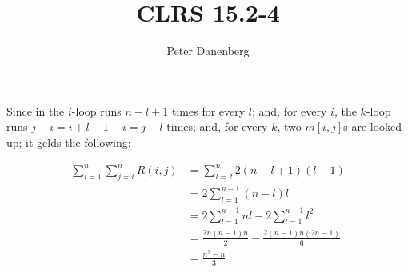 \documentclass{article}
\title{CLRS 15.2-4}
\author{Peter Danenberg}
\begin{document}
\maketitle

Since in  the $i$-loop runs $n - l + 1$ times
for every $l$; and, for every $i$, the $k$-loop runs $j - i = i + l -
1 - i = j - l$ times; and, for every $k$, two $m[i,j]$s are looked up;
it gelds the following:

\begin{align}
  \sum_{i=1}^n\sum_{j=i}^nR(i,j) &= \sum_{l=2}^n2(n-l+1)(l-1)\\
  &= 2\sum_{l=1}^{n-1}(n-l)l\\
  &= 2\sum_{l=1}^{n-1}nl-2\sum_{l=1}^{n-1}l^2\\
  &= \frac{2n(n-1)n}{2} - \frac{2(n-1)n(2n-1)}{6}\\
  &= \frac{n^3 - n}{3}
\end{align}
\end{document}
